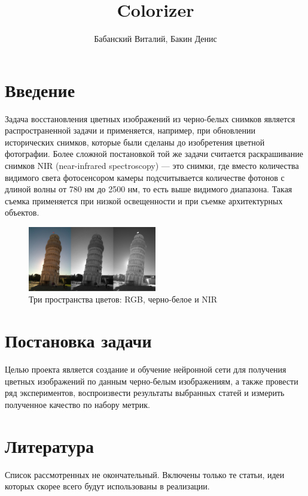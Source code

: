 \documentclass[14pt]{article}
\title{Colorizer}
\author{Бабанский Виталий, Бакин Денис}
\begin{document}
\maketitle

\section{Введение}

Задача восстановления цветных изображений из черно-белых снимков является распространенной задачи и применяется, например,
при обновлении исторических снимков, которые были сделаны до изобретения цветной фотографии.
Более сложной постановкой той же задачи считается раскрашивание снимков NIR (near-infrared spectroscopy) ---
это снимки, где вместо количества видимого света фотосенсором камеры подсчитывается количестве фотонов с длиной волны
от 780 нм до 2500 нм, то есть выше видимого диапазона. Такая съемка применяется при низкой освещенности и
при съемке архитектурных объектов.

\begin{figure}[H]
    \centering
    \includegraphics[width=0.5\textwidth]{resources/pisa_tower_3_colorspaces.jpg}
    \caption{Три пространства цветов: RGB, черно-белое и NIR}
    \label{fig:id_figura}
\end{figure}


\section{Постановка задачи}
Целью проекта является создание и обучение нейронной сети для получения цветных изображений по данным черно-белым изображениям,
а также провести ряд экспериментов, воспроизвести результаты выбранных статей и измерить полученное качество по набору метрик.


\section{Литература}
Список рассмотренных не окончательный. Включены только те статьи, идеи которых скорее всего будут использованы в реализации.
\end{document}
